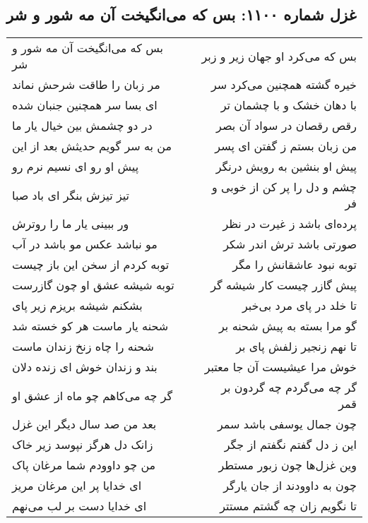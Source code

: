 \begin{center}
\section*{غزل شماره ۱۱۰۰: بس که می‌انگیخت آن مه شور و شر}
\label{sec:1100}
\begin{longtable}{l p{0.5cm} r}
بس که می‌انگیخت آن مه شور و شر
&&
بس که می‌کرد او جهان زیر و زبر
\\
مر زبان را طاقت شرحش نماند
&&
خیره گشته همچنین می‌کرد سر
\\
ای بسا سر همچنین جنبان شده
&&
با دهان خشک و با چشمان تر
\\
در دو چشمش بین خیال یار ما
&&
رقص رقصان در سواد آن بصر
\\
من به سر گویم حدیثش بعد از این
&&
من زبان بستم ز گفتن ای پسر
\\
پیش او رو ای نسیم نرم رو
&&
پیش او بنشین به رویش درنگر
\\
تیز تیزش بنگر ای باد صبا
&&
چشم و دل را پر کن از خوبی و فر
\\
ور ببینی یار ما را روترش
&&
پرده‌ای باشد ز غیرت در نظر
\\
مو نباشد عکس مو باشد در آب
&&
صورتی باشد ترش اندر شکر
\\
توبه کردم از سخن این باز چیست
&&
توبه نبود عاشقانش را مگر
\\
توبه شیشه عشق او چون گازرست
&&
پیش گازر چیست کار شیشه گر
\\
بشکنم شیشه بریزم زیر پای
&&
تا خلد در پای مرد بی‌خبر
\\
شحنه یار ماست هر کو خسته شد
&&
گو مرا بسته به پیش شحنه بر
\\
شحنه را چاه زنخ زندان ماست
&&
تا نهم زنجیر زلفش پای بر
\\
بند و زندان خوش ای زنده دلان
&&
خوش مرا عیشیست آن جا معتبر
\\
گر چه می‌کاهم چو ماه از عشق او
&&
گر چه می‌گردم چه گردون بر قمر
\\
بعد من صد سال دیگر این غزل
&&
چون جمال یوسفی باشد سمر
\\
زانک دل هرگز نپوسد زیر خاک
&&
این ز دل گفتم نگفتم از جگر
\\
من چو داوودم شما مرغان پاک
&&
وین غزل‌ها چون زبور مستطر
\\
ای خدایا پر این مرغان مریز
&&
چون به داوودند از جان یارگر
\\
ای خدایا دست بر لب می‌نهم
&&
تا نگویم زان چه گشتم مستتر
\\
\end{longtable}
\end{center}
